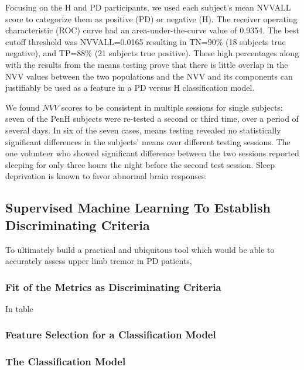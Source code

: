 Focusing on the H and PD participants, we used each subject’s mean NVVALL score to categorize them as positive (PD) or negative (H). The receiver operating characteristic (ROC) curve had an area-under-the-curve value of 0.9354. The best cutoff threshold was NVVALL=0.0165 resulting in TN=90\% (18 subjects true negative), and TP=88\% (21 subjects true positive). These high percentages along with the results from the means testing prove that there is little overlap in the NVV values between the two populations and the NVV and its components can justifiably be used as a feature in a PD versus H classification model. 

We found $NVV$ scores to be consistent in multiple sessions for single subjects: seven of the \gls{PenH} subjects were re-tested a second or third time, over a period of several days. In six of the seven cases, means testing revealed no statistically significant differences in the subjects’ means over different testing sessions. The one volunteer who showed significant difference between the two sessions reported sleeping for only three hours the night before the second test session. Sleep deprivation is known to favor abnormal brain responses.


\subsection{Supervised Machine Learning To Establish Discriminating Criteria}
\label{subsec:PenCTML}
To ultimately build a practical and ubiquitous tool which would be able to accurately assess upper limb tremor in \gls{PD} patients, 

\subsubsection{Fit of the Metrics as Discriminating Criteria}
\label{subsubsec:PenCTMetricsFit}
In table 

\subsubsection{Feature Selection for a Classification Model}
\label{subsubsec:PenCTFeatures}

\subsubsection{The Classification Model}
\label{subsubsec:PenCTClassification}


